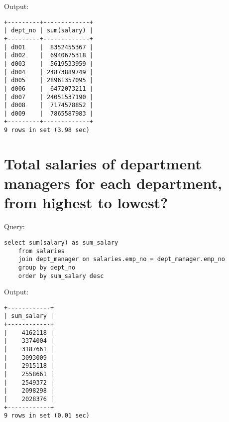 \documentclass[12pt]{article}
\begin{document}
Output:

\begin{verbatim}
+---------+-------------+
| dept_no | sum(salary) |
+---------+-------------+
| d001    |  8352455367 |
| d002    |  6940675318 |
| d003    |  5619533959 |
| d004    | 24873889749 |
| d005    | 28961357095 |
| d006    |  6472073211 |
| d007    | 24051537190 |
| d008    |  7174578852 |
| d009    |  7865587983 |
+---------+-------------+
9 rows in set (3.98 sec)
\end{verbatim}


\section{Total salaries of department managers for each department, from highest to lowest?}

Query:

\begin{verbatim}
select sum(salary) as sum_salary
    from salaries
    join dept_manager on salaries.emp_no = dept_manager.emp_no
    group by dept_no
    order by sum_salary desc
\end{verbatim}

Output:

\begin{verbatim}
+------------+
| sum_salary |
+------------+
|    4162118 |
|    3374004 |
|    3187661 |
|    3093009 |
|    2915118 |
|    2558661 |
|    2549372 |
|    2098298 |
|    2028376 |
+------------+
9 rows in set (0.01 sec)
\end{verbatim}

\end{document}
